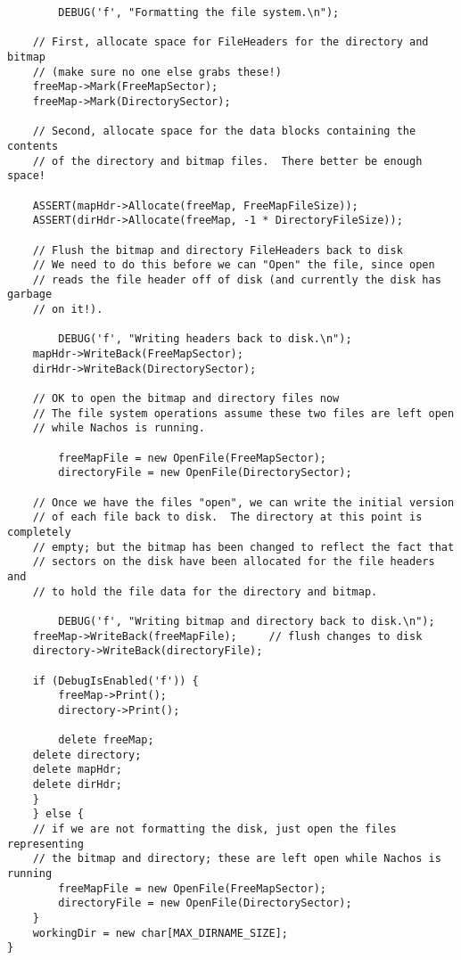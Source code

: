 \documentclass[a4paper,10pt]{article}
\begin{document}
\begin{lstlisting}
        DEBUG('f', "Formatting the file system.\n");

    // First, allocate space for FileHeaders for the directory and bitmap
    // (make sure no one else grabs these!)
    freeMap->Mark(FreeMapSector);
    freeMap->Mark(DirectorySector);

    // Second, allocate space for the data blocks containing the contents
    // of the directory and bitmap files.  There better be enough space!

    ASSERT(mapHdr->Allocate(freeMap, FreeMapFileSize));
    ASSERT(dirHdr->Allocate(freeMap, -1 * DirectoryFileSize));

    // Flush the bitmap and directory FileHeaders back to disk
    // We need to do this before we can "Open" the file, since open
    // reads the file header off of disk (and currently the disk has garbage
    // on it!).

        DEBUG('f', "Writing headers back to disk.\n");
    mapHdr->WriteBack(FreeMapSector);
    dirHdr->WriteBack(DirectorySector);

    // OK to open the bitmap and directory files now
    // The file system operations assume these two files are left open
    // while Nachos is running.

        freeMapFile = new OpenFile(FreeMapSector);
        directoryFile = new OpenFile(DirectorySector);

    // Once we have the files "open", we can write the initial version
    // of each file back to disk.  The directory at this point is completely
    // empty; but the bitmap has been changed to reflect the fact that
    // sectors on the disk have been allocated for the file headers and
    // to hold the file data for the directory and bitmap.

        DEBUG('f', "Writing bitmap and directory back to disk.\n");
    freeMap->WriteBack(freeMapFile);     // flush changes to disk
    directory->WriteBack(directoryFile);

    if (DebugIsEnabled('f')) {
        freeMap->Print();
        directory->Print();

        delete freeMap;
    delete directory;
    delete mapHdr;
    delete dirHdr;
    }
    } else {
    // if we are not formatting the disk, just open the files representing
    // the bitmap and directory; these are left open while Nachos is running
        freeMapFile = new OpenFile(FreeMapSector);
        directoryFile = new OpenFile(DirectorySector);
    }
    workingDir = new char[MAX_DIRNAME_SIZE];
}


\end{lstlisting}
\end{document}
